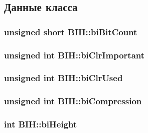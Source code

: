 \subsection{Данные класса}
\hypertarget{struct_b_i_h_aa4aa4ed3d42e54f55121d5e072dec72a}{
\subsubsection[{bi\+Bit\+Count}]{\setlength{\rightskip}{0pt plus 5cm}unsigned short B\+I\+H\+::bi\+Bit\+Count}}\label{struct_b_i_h_aa4aa4ed3d42e54f55121d5e072dec72a}
\hypertarget{struct_b_i_h_a6ac4cd8b84b3063c67f107f47a50d684}{
\subsubsection[{bi\+Clr\+Important}]{\setlength{\rightskip}{0pt plus 5cm}unsigned int B\+I\+H\+::bi\+Clr\+Important}}\label{struct_b_i_h_a6ac4cd8b84b3063c67f107f47a50d684}
\hypertarget{struct_b_i_h_a59ed2b0491d943593332466b0c5f9784}{
\subsubsection[{bi\+Clr\+Used}]{\setlength{\rightskip}{0pt plus 5cm}unsigned int B\+I\+H\+::bi\+Clr\+Used}}\label{struct_b_i_h_a59ed2b0491d943593332466b0c5f9784}
\hypertarget{struct_b_i_h_aec9ae542b9f83c9592945261d977b77e}{
\subsubsection[{bi\+Compression}]{\setlength{\rightskip}{0pt plus 5cm}unsigned int B\+I\+H\+::bi\+Compression}}\label{struct_b_i_h_aec9ae542b9f83c9592945261d977b77e}
\hypertarget{struct_b_i_h_a02827f70f0a626b10ea29076436704bc}{
\subsubsection[{bi\+Height}]{\setlength{\rightskip}{0pt plus 5cm}int B\+I\+H\+::bi\+Height}}\label{struct_b_i_h_a02827f70f0a626b10ea29076436704bc}
